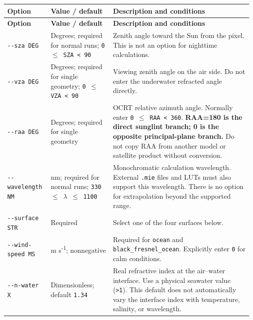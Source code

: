 {\TableFont
\begin{longtable}{@{}>{\raggedright\arraybackslash}p{}>{\raggedright\arraybackslash}p{}>{\raggedright\arraybackslash}p{}@{}}
\toprule
\textbf{Option} & \textbf{Value / default} & \textbf{Description and conditions} \\
\midrule
\endfirsthead
\toprule
\textbf{Option} & \textbf{Value / default} & \textbf{Description and conditions} \\
\midrule
\endhead
\bottomrule
\endfoot
\texttt{-\allowbreak{}-\allowbreak{}sza DEG} & Degrees; required for normal runs; \texttt{0 \ensuremath{\leq} SZA < 90} & Zenith angle toward the Sun from the pixel. This is not an option for nighttime calculations. \\
\texttt{-\allowbreak{}-\allowbreak{}vza DEG} & Degrees; required for single geometry; \texttt{0 \ensuremath{\leq} VZA < 90} & Viewing zenith angle on the air side. Do not enter the underwater refracted angle directly. \\
\texttt{-\allowbreak{}-\allowbreak{}raa DEG} & Degrees; required for single geometry & OCRT relative azimuth angle. Normally enter \texttt{0 \ensuremath{\leq} RAA < 360}. \textbf{RAA=180\textdegree{} is the direct sunglint branch; 0\textdegree{} is the opposite principal-plane branch.} Do not copy RAA from another model or satellite product without conversion. \\
\texttt{-\allowbreak{}-\allowbreak{}wavelength NM} & nm; required for normal runs; \texttt{330 \ensuremath{\leq} \ensuremath{\lambda} \ensuremath{\leq} 1100} & Monochromatic calculation wavelength. External \texttt{.\allowbreak{}mie} files and LUTs must also support this wavelength. There is no option for extrapolation beyond the supported range. \\
\texttt{-\allowbreak{}-\allowbreak{}surface STR} & Required & Select one of the four surfaces below. \\
\texttt{-\allowbreak{}-\allowbreak{}wind-\allowbreak{}speed MS} & m s\textsuperscript{-}\textsuperscript{1}; nonnegative & Required for \texttt{ocean} and \texttt{black\_\allowbreak{}fresnel\_\allowbreak{}ocean}. Explicitly enter \texttt{0} for calm conditions. \\
\texttt{-\allowbreak{}-\allowbreak{}n-\allowbreak{}water X} & Dimensionless; default \texttt{1.\allowbreak{}34} & Real refractive index at the air--water interface. Use a physical seawater value (\texttt{>1}). This default does not automatically vary the interface index with temperature, salinity, or wavelength. \\

\end{longtable}}

